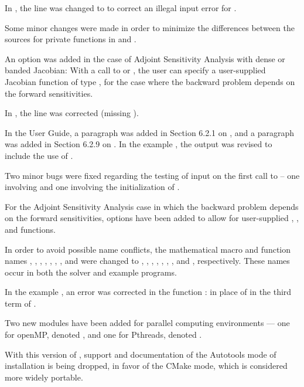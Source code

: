 In , the line  was changed to
 to correct an illegal input error for .

Some minor changes were made in order to minimize the differences
between the sources for private functions in {\cvodes} and {\cvode} .

An option was added in the case of Adjoint Sensitivity Analysis with
dense or banded Jacobian:  With a call to  or
, the user can specify a user-supplied Jacobian
function of type , for the case where the backward
problem depends on the forward sensitivities.

In , the line 
was corrected (missing ).

In the User Guide, a paragraph was added in Section 6.2.1 on
, and a paragraph was added in Section 6.2.9 on
.  In the example , the output
was revised to include the use of .

Two minor bugs were fixed regarding the testing of input on the first
call to  -- one involving  and one involving the
initialization of .

For the Adjoint Sensitivity Analysis case in which the backward problem
depends on the forward sensitivities, options have been added to allow
for user-supplied , , and  functions.

In order to avoid possible name conflicts, the mathematical macro
and function names , , , , ,
, , and  were changed to
, , , , ,
, , and , respectively.
These names occur in both the solver and example programs.

In the example , an error was corrected in the
function :  in place of  in the third term of
.

Two new {\nvector} modules have been added for parallel computing
environments --- one for openMP, denoted ,
and one for Pthreads, denoted .

With this version of {\sundials}, support and documentation of the
Autotools mode of installation is being dropped, in favor of the
CMake mode, which is considered more widely portable.

